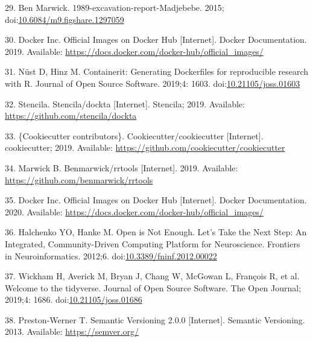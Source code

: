 \documentclass[10pt,letterpaper]{article}
\begin{document}
\leavevmode\hypertarget{ref-marwick_madjebebe_2015}{}%
29. Ben Marwick. 1989-excavation-report-Madjebebe. 2015;
doi:\href{https://doi.org/10.6084/m9.figshare.1297059}{10.6084/m9.figshare.1297059}

\leavevmode\hypertarget{ref-docker_inc_official_2019}{}%
30. Docker Inc. Official Images on Docker Hub {[}Internet{]}. Docker
Documentation. 2019. Available:
\url{https://docs.docker.com/docker-hub/official_images/}

\leavevmode\hypertarget{ref-nust_containerit_2019}{}%
31. Nüst D, Hinz M. Containerit: Generating Dockerfiles for reproducible
research with R. Journal of Open Source Software. 2019;4: 1603.
doi:\href{https://doi.org/10.21105/joss.01603}{10.21105/joss.01603}

\leavevmode\hypertarget{ref-stencila_dockta_2019}{}%
32. Stencila. Stencila/dockta {[}Internet{]}. Stencila; 2019. Available:
\url{https://github.com/stencila/dockta}

\leavevmode\hypertarget{ref-cookiecutter_contributors_cookiecutter_2019}{}%
33. \{Cookiecutter contributors\}. Cookiecutter/cookiecutter
{[}Internet{]}. cookiecutter; 2019. Available:
\url{https://github.com/cookiecutter/cookiecutter}

\leavevmode\hypertarget{ref-marwick_rrtools_2019}{}%
34. Marwick B. Benmarwick/rrtools {[}Internet{]}. 2019. Available:
\url{https://github.com/benmarwick/rrtools}

\leavevmode\hypertarget{ref-docker_inc_official_2020}{}%
35. Docker Inc. Official Images on Docker Hub {[}Internet{]}. Docker
Documentation. 2020. Available:
\url{https://docs.docker.com/docker-hub/official_images/}

\leavevmode\hypertarget{ref-halchenko_open_2012}{}%
36. Halchenko YO, Hanke M. Open is Not Enough. Let's Take the Next Step:
An Integrated, Community-Driven Computing Platform for Neuroscience.
Frontiers in Neuroinformatics. 2012;6.
doi:\href{https://doi.org/10.3389/fninf.2012.00022}{10.3389/fninf.2012.00022}

\leavevmode\hypertarget{ref-Wickham2019}{}%
37. Wickham H, Averick M, Bryan J, Chang W, McGowan L, François R, et
al. Welcome to the tidyverse. Journal of Open Source Software. The Open
Journal; 2019;4: 1686.
doi:\href{https://doi.org/10.21105/joss.01686}{10.21105/joss.01686}

\leavevmode\hypertarget{ref-preston-werner_semantic_2013}{}%
38. Preston-Werner T. Semantic Versioning 2.0.0 {[}Internet{]}. Semantic
Versioning. 2013. Available: \url{https://semver.org/}
\end{document}
